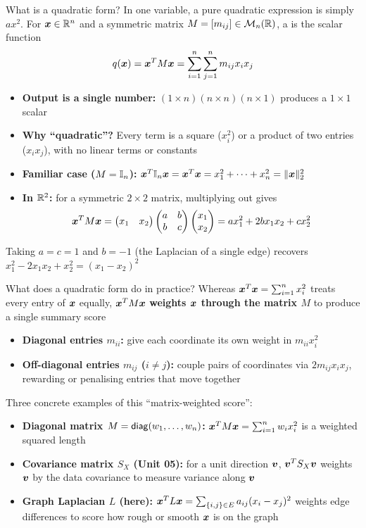 \documentclass[aspectratio=169]{beamer}\usepackage[]{graphicx}\usepackage[]{xcolor}
\begin{document}
\begin{frame}{What is a quadratic form?}
In one variable, a pure quadratic expression is simply $a x^2$.
For $\bm{x} \in \mathbb{R}^n$ and a symmetric matrix $M = [m_{ij}] \in \mathcal{M}_n(\mathbb{R})$, a  is the scalar function
\[
q(\bm{x}) = \bm{x}^T M \bm{x} = \sum_{i=1}^n \sum_{j=1}^n m_{ij} x_i x_j
\]
\vfill
\begin{itemize}
\item \textbf{Output is a single number:} $(1 \times n)(n \times n)(n \times 1)$ produces a $1 \times 1$ scalar
\item \textbf{Why ``quadratic''?} Every term is a square ($x_i^2$) or a product of two entries ($x_i x_j$), with no linear terms or constants
\item \textbf{Familiar case ($M = \mathbb{I}_n$):} $\bm{x}^T \mathbb{I}_n \bm{x} = \bm{x}^T \bm{x} = x_1^2 + \cdots + x_n^2 = \|\bm{x}\|_2^2$
\item \textbf{In $\mathbb{R}^2$:} for a symmetric $2 \times 2$ matrix, multiplying out gives
\[
\bm{x}^T M \bm{x} = \begin{pmatrix} x_1 & x_2 \end{pmatrix} \begin{pmatrix} a & b \\ b & c \end{pmatrix} \begin{pmatrix} x_1 \\ x_2 \end{pmatrix} = a x_1^2 + 2b x_1 x_2 + c x_2^2
\]
\end{itemize}
\vfill
Taking $a = c = 1$ and $b = -1$ (the Laplacian of a single edge) recovers $x_1^2 - 2x_1 x_2 + x_2^2 = (x_1 - x_2)^2$
\end{frame}


\begin{frame}{What does a quadratic form do in practice?}
Whereas $\bm{x}^T \bm{x} = \sum_{i=1}^n x_i^2$ treats every entry of $\bm{x}$ equally, $\bm{x}^T M \bm{x}$ \textbf{weights $\bm{x}$ through the matrix $M$} to produce a single summary score
\vfill
\begin{itemize}
\item \textbf{Diagonal entries $m_{ii}$:} give each coordinate its own weight in $m_{ii} x_i^2$
\item \textbf{Off-diagonal entries $m_{ij}$ ($i \neq j$):} couple pairs of coordinates via $2 m_{ij} x_i x_j$, rewarding or penalising entries that move together
\end{itemize}
\vfill
Three concrete examples of this ``matrix-weighted score'':
\begin{itemize}
\item \textbf{Diagonal matrix $M = \mathsf{diag}(w_1, \ldots, w_n)$:} $\bm{x}^T M \bm{x} = \sum_{i=1}^n w_i x_i^2$ is a weighted squared length
\item \textbf{Covariance matrix $S_X$ (Unit 05):} for a unit direction $\bm{v}$, $\bm{v}^T S_X \bm{v}$ weights $\bm{v}$ by the data covariance to measure variance along $\bm{v}$
\item \textbf{Graph Laplacian $L$ (here):} $\bm{x}^T L \bm{x} = \sum_{\{i, j\} \in E} a_{ij}(x_i - x_j)^2$ weights edge differences to score how rough or smooth $\bm{x}$ is on the graph
\end{itemize}
\end{frame}
\end{document}
